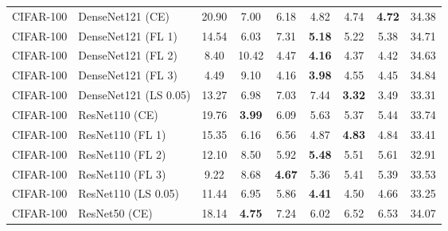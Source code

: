 \begin{table}[h!]
{\begin{tabular}{llccccccc}
   CIFAR-100 &            DenseNet121 (CE) &                 20.90 &                  7.00 &                  6.18 &                  4.82 &                  4.74 & \textbf{4.72} &                 34.38 \\
   CIFAR-100 &          DenseNet121 (FL 1) &                 14.54 &                  6.03 &                  7.31 & \textbf{5.18} &                  5.22 &                  5.38 &                 34.71 \\
   CIFAR-100 &          DenseNet121 (FL 2) &                  8.40 &                 10.42 &                  4.47 & \textbf{4.16} &                  4.37 &                  4.42 &                 34.63 \\
   CIFAR-100 &          DenseNet121 (FL 3) &                  4.49 &                  9.10 &                  4.16 & \textbf{3.98} &                  4.55 &                  4.45 &                 34.84 \\
   CIFAR-100 &       DenseNet121 (LS 0.05) &                 13.27 &                  6.98 &                  7.03 &                  7.44 & \textbf{3.32} &                  3.49 &                 33.31 \\
   CIFAR-100 &              ResNet110 (CE) &                 19.76 & \textbf{3.99} &                  6.09 &                  5.63 &                  5.37 &                  5.44 &                 33.74 \\
   CIFAR-100 &            ResNet110 (FL 1) &                 15.35 &                  6.16 &                  6.56 &                  4.87 & \textbf{4.83} &                  4.84 &                 33.41 \\
   CIFAR-100 &            ResNet110 (FL 2) &                 12.10 &                  8.50 &                  5.92 & \textbf{5.48} &                  5.51 &                  5.61 &                 32.91 \\
   CIFAR-100 &            ResNet110 (FL 3) &                  9.22 &                  8.68 & \textbf{4.67} &                  5.36 &                  5.41 &                  5.39 &                 33.53 \\
   CIFAR-100 &         ResNet110 (LS 0.05) &                 11.44 &                  6.95 &                  5.86 & \textbf{4.41} &                  4.50 &                  4.66 &                 33.25 \\
   CIFAR-100 &               ResNet50 (CE) &                 18.14 & \textbf{4.75} &                  7.24 &                  6.02 &                  6.52 &                  6.53 &                 34.07 \\

\end{tabular}}
\end{table}
